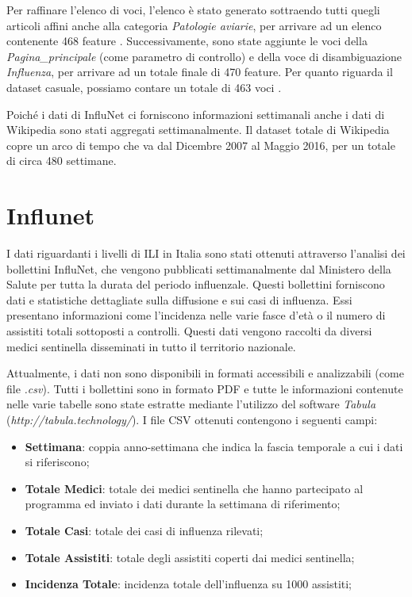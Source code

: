 Per raffinare l'elenco di voci, l'elenco è stato generato sottraendo tutti quegli articoli affini anche alla categoria 
\textit{Patologie aviarie}, per arrivare ad un elenco contenente 468 feature \cite{PetScanQuery}. Successivamente, sono state 
aggiunte le voci della \textit{Pagina_principale} (come parametro di controllo) e della voce di disambiguazione 
\textit{Influenza}, per arrivare ad un totale finale di 470 feature. Per quanto riguarda il dataset casuale, possiamo contare 
un totale di 463 voci \cite{PetScanRandom}.
\bigskip

Poiché i dati di InfluNet ci forniscono informazioni settimanali anche i dati di Wikipedia sono stati aggregati 
settimanalmente. Il dataset totale di Wikipedia copre un arco di tempo che va dal Dicembre 2007 al Maggio 2016, per un totale 
di circa 480 settimane.

\section{Influnet}
\bigskip 

I dati riguardanti i livelli di ILI in Italia sono stati ottenuti attraverso l'analisi dei bollettini InfluNet,
che vengono pubblicati settimanalmente dal Ministero della Salute per tutta la durata del periodo influenzale.
Questi bollettini forniscono dati e statistiche dettagliate sulla diffusione e sui casi di influenza. Essi presentano 
informazioni come l'incidenza nelle varie fasce d'età o il numero di assistiti totali sottoposti a controlli. 
Questi dati vengono raccolti da diversi medici sentinella disseminati in tutto il territorio nazionale.
\bigskip

Attualmente, i dati non sono disponibili in formati accessibili e analizzabili (come file \textit{.csv}). Tutti i bollettini
sono in formato PDF e tutte le informazioni contenute nelle varie tabelle sono state estratte mediante l'utilizzo del software \textit{Tabula} (\textit{http://tabula.technology/}). I file CSV ottenuti contengono i seguenti campi:
\begin{itemize}[noitemsep]
\item \textbf{Settimana}: coppia anno-settimana che indica la fascia temporale a cui i dati si riferiscono;
\item \textbf{Totale Medici}: totale dei medici sentinella che hanno partecipato al programma ed inviato i dati durante la settimana di riferimento; 
\item \textbf{Totale Casi}: totale dei casi di influenza rilevati;
\item \textbf{Totale Assistiti}: totale degli assistiti coperti dai medici sentinella;
\item \textbf{Incidenza Totale}: incidenza totale dell'influenza su 1000 assistiti;
\end{itemize}
\bigskip

